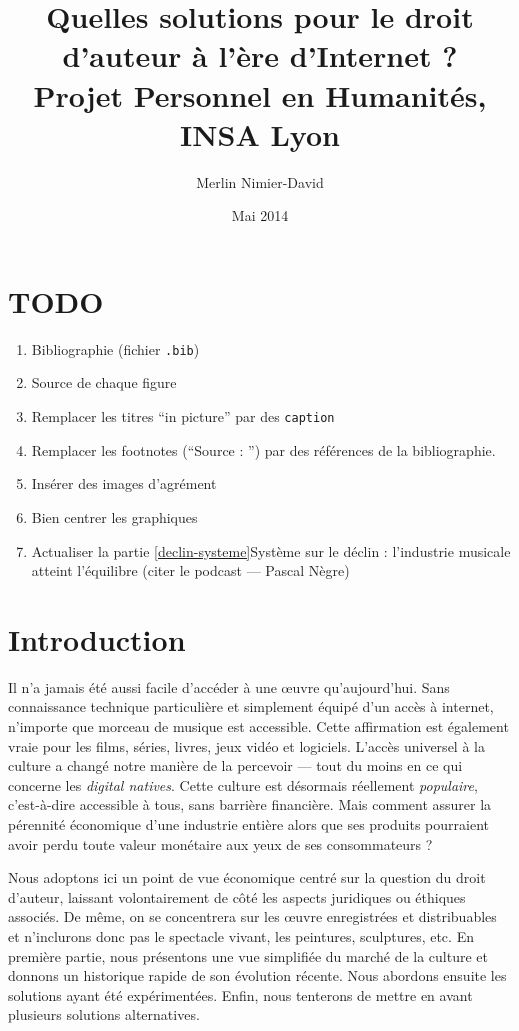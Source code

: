 \documentclass[a4paper]{report}
\title{
	Quelles solutions pour le droit d'auteur à l'ère d'Internet ?\\
	Projet Personnel en Humanités, INSA Lyon
}
\author{Merlin Nimier-David}
\date{Mai 2014}
\begin{document}
	\maketitle

	\tableofcontents

	\chapter{TODO}
	\begin{enumerate}
		\item Bibliographie (fichier \texttt{.bib})
		\item Source de chaque figure
		\item Remplacer les titres ``in picture'' par des \texttt{caption}
		\item Remplacer les footnotes (``Source : '') par des références de la bibliographie.
		\item Insérer des images d'agrément
		\item Bien centrer les graphiques
		\item Actualiser la partie \ref{declin-systeme}{Système sur le déclin} : l'industrie musicale atteint l'équilibre (citer le podcast — Pascal Nègre)
	\end{enumerate}


	\chapter{Introduction}
	Il n'a jamais été aussi facile d'accéder à une œuvre qu'aujourd'hui. Sans connaissance technique particulière et simplement équipé d'un accès à internet, n'importe que morceau de musique est accessible. Cette affirmation est également vraie pour les films, séries, livres, jeux vidéo et logiciels. L'accès universel à la culture a changé notre manière de la percevoir — tout du moins en ce qui concerne les \emph{digital natives}. Cette culture est désormais réellement \emph{populaire}, c'est-à-dire accessible à tous, sans barrière financière. Mais comment assurer la pérennité économique d'une industrie entière alors que ses produits pourraient avoir perdu toute valeur monétaire aux yeux de ses consommateurs ?

	Nous adoptons ici un point de vue économique centré sur la question du droit d'auteur, laissant volontairement de côté les aspects juridiques ou éthiques associés. De même, on se concentrera sur les œuvre enregistrées et distribuables et n'inclurons donc pas le spectacle vivant, les peintures, sculptures, etc. En première partie, nous présentons une vue simplifiée du marché de la culture et donnons un historique rapide de son évolution récente. Nous abordons ensuite les solutions ayant été expérimentées. Enfin, nous tenterons de mettre en avant plusieurs solutions alternatives.
\end{document}
